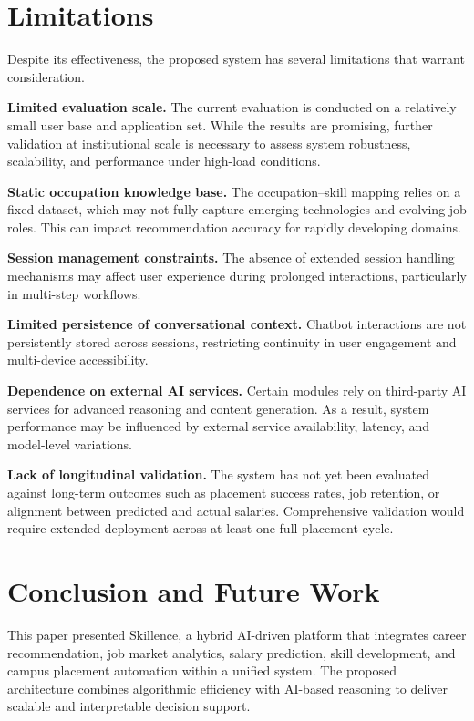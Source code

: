 \documentclass[conference]{IEEEtran}
\begin{document}
\section{Limitations}
Despite its effectiveness, the proposed system has several limitations
that warrant consideration.

\textbf{Limited evaluation scale.} The current evaluation is conducted
on a relatively small user base and application set. While the results
are promising, further validation at institutional scale is necessary
to assess system robustness, scalability, and performance under
high-load conditions.

\textbf{Static occupation knowledge base.} The occupation--skill
mapping relies on a fixed dataset, which may not fully capture emerging
technologies and evolving job roles. This can impact recommendation
accuracy for rapidly developing domains.

\textbf{Session management constraints.} The absence of extended session
handling mechanisms may affect user experience during prolonged
interactions, particularly in multi-step workflows.

\textbf{Limited persistence of conversational context.} Chatbot
interactions are not persistently stored across sessions, restricting
continuity in user engagement and multi-device accessibility.

\textbf{Dependence on external AI services.} Certain modules rely on
third-party AI services for advanced reasoning and content generation.
As a result, system performance may be influenced by external service
availability, latency, and model-level variations.

\textbf{Lack of longitudinal validation.} The system has not yet been
evaluated against long-term outcomes such as placement success rates,
job retention, or alignment between predicted and actual salaries.
Comprehensive validation would require extended deployment across at
least one full placement cycle.

\section{Conclusion and Future Work}

This paper presented Skillence, a hybrid AI-driven platform that
integrates career recommendation, job market analytics, salary
prediction, skill development, and campus placement automation within
a unified system. The proposed architecture combines algorithmic
efficiency with AI-based reasoning to deliver scalable and interpretable
decision support.
\end{document}
